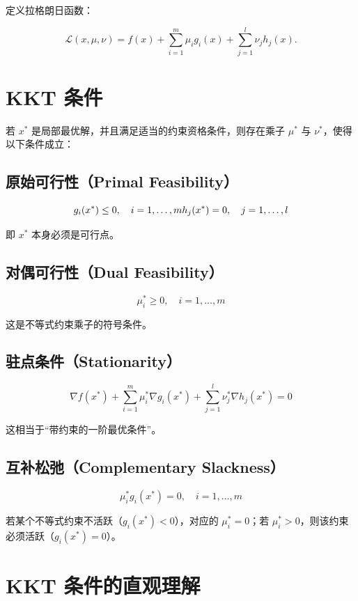 定义拉格朗日函数：

\[
\mathcal{L}(x,\mu,\nu)
=
f(x)
+
\sum_{i=1}^m \mu_i g_i(x)
+
\sum_{j=1}^l \nu_j h_j(x).
\]

\section{KKT 条件}

若 \(x^*\) 是局部最优解，并且满足适当的约束资格条件，则存在乘子 \(\mu^*\) 与 \(\nu^*\)，使得以下条件成立：

\subsection{原始可行性（Primal Feasibility）}

\[
g_i(x^*) \le 0,\quad i=1,\dots,m \\

h_j(x^*) = 0,\quad j=1,\dots,l
\]

即 \(x^*\) 本身必须是可行点。

\subsection{对偶可行性（Dual Feasibility）}

\[
\mu_i^* \ge 0,\quad i=1,\dots,m
\]

这是不等式约束乘子的符号条件。

\subsection{驻点条件（Stationarity）}

\[
\nabla f(x^*)
+
\sum_{i=1}^m \mu_i^* \nabla g_i(x^*)
+
\sum_{j=1}^l \nu_j^* \nabla h_j(x^*)
=0
\]

这相当于“带约束的一阶最优条件”。

\subsection{互补松弛（Complementary Slackness）}

\[
\mu_i^* g_i(x^*) = 0,\quad i=1,\dots,m
\]

若某个不等式约束不活跃（\(g_i(x^*)<0\)），对应的 \(\mu_i^*=0\)；若 \(\mu_i^*>0\)，则该约束必须活跃（\(g_i(x^*)=0\)）。

\section{KKT 条件的直观理解}

